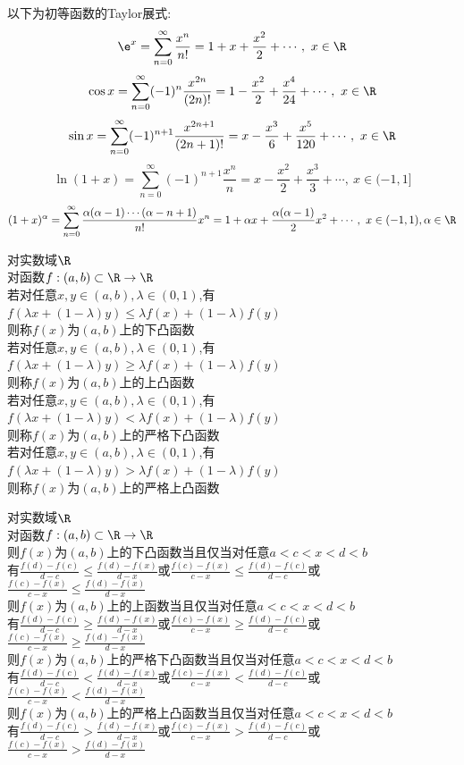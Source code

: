 \begin{zhu}
以下为初等函数的Taylor展式:\\
\[\e^x=\sum\limits_{n=0}^{\infty}\frac{x^n}{n!}=1+x+\frac{x^2}{2}+\cdots,\  x\in\R\]
\[\cos x=\sum\limits_{n=0}^{\infty}(-1)^{n}\frac{x^{2n}}{(2n)!}=1-\frac{x^2}{2}+\frac{x^4}{24}+\cdots,\  x\in\R\]
\[\sin x=\sum\limits_{n=0}^{\infty}(-1)^{n+1}\frac{x^{2n+1}}{(2n+1)!}=x-\frac{x^3}{6}+\frac{x^5}{120}+\cdots,\  x\in\R\]
\[\ln(1+x)=\sum\limits_{n=0}^{\infty}(-1)^{n+1}\frac{x^{n}}{n}=x-\frac{x^2}{2}+\frac{x^3}{3}+\cdots,\  x\in(-1,1]\]
\[(1+x)^{\alpha}=\sum\limits_{n=0}^{\infty}\frac{\alpha(\alpha-1)\cdots(\alpha-n+1)}{n!}x^n=1+\alpha x+\frac{\alpha(\alpha-1)}{2}x^2+\cdots,\ x\in(-1,1),\alpha\in\R\]
\end{zhu}

\begin{dingyi}
对实数域$\R$\\
对函数$f:(a,b)\subset \R \to \R$\\
若对任意$x,y\in(a,b),\lambda\in(0,1)$,有$f(\lambda x+(1-\lambda)y)\leq \lambda f(x)+(1-\lambda)f(y)$\\
则称$f(x)$为$(a,b)$上的下凸函数\\
若对任意$x,y\in(a,b),\lambda\in(0,1)$,有$f(\lambda x+(1-\lambda)y)\geq \lambda f(x)+(1-\lambda)f(y)$\\
则称$f(x)$为$(a,b)$上的上凸函数\\
若对任意$x,y\in(a,b),\lambda\in(0,1)$,有$f(\lambda x+(1-\lambda)y)< \lambda f(x)+(1-\lambda)f(y)$\\
则称$f(x)$为$(a,b)$上的严格下凸函数\\
若对任意$x,y\in(a,b),\lambda\in(0,1)$,有$f(\lambda x+(1-\lambda)y)> \lambda f(x)+(1-\lambda)f(y)$\\
则称$f(x)$为$(a,b)$上的严格上凸函数
\end{dingyi}

\begin{dingli}
对实数域$\R$\\
对函数$f:(a,b)\subset \R \to \R$\\
则$f(x)$为$(a,b)$上的下凸函数当且仅当对任意$a<c<x<d<b$\\
有$\frac{f(d)-f(c)}{d-c}\leq \frac{f(d)-f(x)}{d-x}$或$\frac{f(c)-f(x)}{c-x}\leq \frac{f(d)-f(c)}{d-c}$或$\frac{f(c)-f(x)}{c-x}\leq \frac{f(d)-f(x)}{d-x}$\\
则$f(x)$为$(a,b)$上的上函数当且仅当对任意$a<c<x<d<b$\\
有$\frac{f(d)-f(c)}{d-c}\geq \frac{f(d)-f(x)}{d-x}$或$\frac{f(c)-f(x)}{c-x}\geq \frac{f(d)-f(c)}{d-c}$或$\frac{f(c)-f(x)}{c-x}\geq \frac{f(d)-f(x)}{d-x}$\\
则$f(x)$为$(a,b)$上的严格下凸函数当且仅当对任意$a<c<x<d<b$\\
有$\frac{f(d)-f(c)}{d-c}<\frac{f(d)-f(x)}{d-x}$或$\frac{f(c)-f(x)}{c-x}<\frac{f(d)-f(c)}{d-c}$或$\frac{f(c)-f(x)}{c-x}< \frac{f(d)-f(x)}{d-x}$\\
则$f(x)$为$(a,b)$上的严格上凸函数当且仅当对任意$a<c<x<d<b$\\
有$\frac{f(d)-f(c)}{d-c}>\frac{f(d)-f(x)}{d-x}$或$\frac{f(c)-f(x)}{c-x}>\frac{f(d)-f(c)}{d-c}$或$\frac{f(c)-f(x)}{c-x}> \frac{f(d)-f(x)}{d-x}$
\end{dingli}

